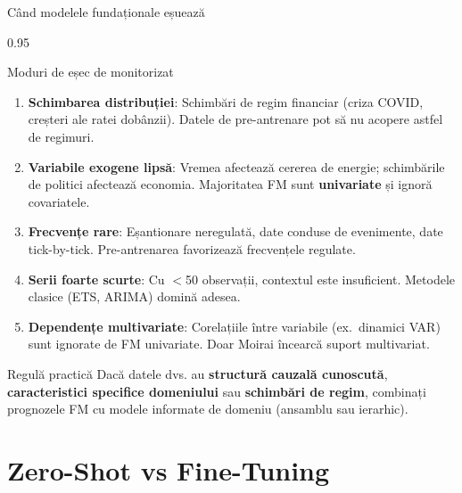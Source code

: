 \documentclass[9pt, aspectratio=169, t]{beamer}
\begin{document}
\begin{frame}{Când modelele fundaționale eșuează}
    \begin{cminipage}{0.95\textwidth}
    \vspace{-3mm}
    \begin{alertblock}{Moduri de eșec de monitorizat}
        {\scriptsize
        \begin{enumerate}\setlength{\itemsep}{0pt}
            \item \textbf{Schimbarea distribuției}: Schimbări de regim financiar (criza COVID, creșteri ale ratei dobânzii). Datele de pre-antrenare pot să nu acopere astfel de regimuri.
            \item \textbf{Variabile exogene lipsă}: Vremea afectează cererea de energie; schimbările de politici afectează economia. Majoritatea FM sunt \textbf{univariate} și ignoră covariatele.
            \item \textbf{Frecvențe rare}: Eșantionare neregulată, date conduse de evenimente, date tick-by-tick. Pre-antrenarea favorizează frecvențele regulate.
            \item \textbf{Serii foarte scurte}: Cu $<$50 observații, contextul este insuficient. Metodele clasice (ETS, ARIMA) domină adesea.
            \item \textbf{Dependențe multivariate}: Corelațiile între variabile (ex.\ dinamici VAR) sunt ignorate de FM univariate. Doar Moirai încearcă suport multivariat.
        \end{enumerate}
        }
    \end{alertblock}
    \vspace{-3mm}
    \begin{exampleblock}{Regulă practică}
        {\scriptsize Dacă datele dvs. au \textbf{structură cauzală cunoscută}, \textbf{caracteristici specifice domeniului} sau \textbf{schimbări de regim}, combinați prognozele FM cu modele informate de domeniu (ansamblu sau ierarhic).}
    \end{exampleblock}
    \end{cminipage}
\end{frame}

\section{Zero-Shot vs Fine-Tuning}
\end{document}
